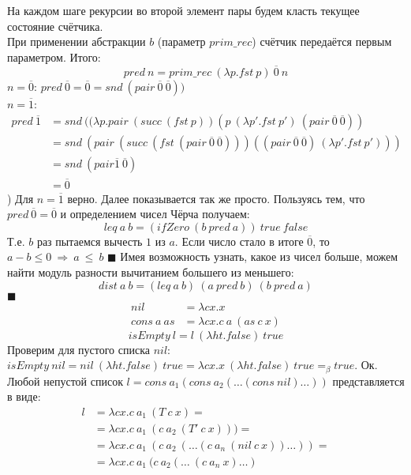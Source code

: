 {\color{red}}
На каждом шаге рекурсии во второй элемент пары будем класть текущее состояние счётчика. \\
При применении абстракции $b$ (параметр $prim\_rec$) счётчик передаётся первым параметром. Итого:
\[
pred\ n = prim\_rec\ (\lambda p.fst\ p)\ \overline{0}\ n
\]
$n=\overline{0}$: $pred\ \overline{0} = \overline{0} = snd\ (pair\ \overline{0}\ \overline{0}))$\\
$n=\overline{1}$: 
\begin{equation*}
\begin{split}
pred\ \overline{1} &= snd\ ((\lambda p.pair\ (succ\ (fst\ p))(p\ (\lambda p'.fst\ p')\ (pair\ \overline{0}\ \overline{0}))\\
			       &= snd\ (pair\ (succ\ (fst\ (pair\ \overline{0}\ \overline{0})))((pair\ \overline{0}\ \overline{0})\ (\lambda p'.fst\ p')))\\
			       &= snd\ (pair \overline{1}\ \overline{0}) \\
			       &= \overline{0}
\end{split}
\end{equation*}) 
Для $n=\overline{1}$ верно. Далее показывается так же просто.
Пользуясь тем, что $pred\ \overline{0} = \overline{0}$ и определением чисел Чёрча получаем:
\[
leq\ a\ b = (ifZero\ (b\ pred\ a))\ true\ false
\]
Т.е. $b$ раз пытаемся вычесть $1$ из $a$. Если число стало в итоге $\overline{0}$, то $a-b \leq 0\ \Rightarrow\ a\ \leq\ b$ \hfill $\blacksquare$
Имея возможность узнать, какое из чисел больше, можем найти модуль разности вычитанием большего из меньшего:
\[
dist\ a\ b = (leq\ a\ b)\ (a\ pred\ b)\ (b\ pred\ a)
\]
\hfill $\blacksquare$
\begin{align*}
	nil &= \lambda cx.x \\
	cons\ a\ as &= \lambda cx.c\ a\ (as\ c\ x)
\end{align*}
\[isEmpty\ l = l\ (\lambda ht.false)\ true\]
Проверим для пустого списка $nil$: $isEmpty\ nil = nil\ (\lambda ht.false)\ true = \lambda cx.x\ (\lambda ht.false)\ 
true =_\beta true$. Ок. Любой непустой список $l = cons\ a_1 (cons\ a_2 (\ldots(cons\ nil)\ldots))$ представляется в виде:
\begin{align}
l &= \lambda cx.c\ a_1\ (T\ c\ x)=\\
  &= \lambda cx.c\ a_1\ (c\ a_2\ (T'\ c\ x)))=\\
  &= \lambda cx.c\ a_1\ (c\ a_2\ (\ldots (c\ a_n\ (nil\ c\ x))\ldots))=\\
  &= \lambda cx.c\ a_1\ (c\ a_2(\ldots\ (c\ a_n\ x)\ldots) \label{eq:list}
\end{align}
